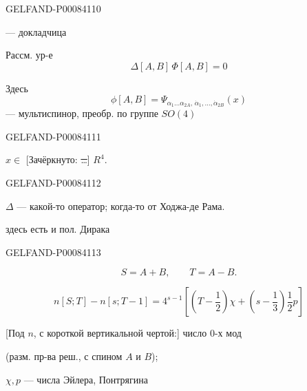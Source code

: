 \begin{GelfandAdjacentEvidence}{GELFAND-P000841}{10}


 — докладчица

Рассм. ур-е
\begin{equation*}
\Delta[A,B]\,\Phi[A,B]=0 \tag{1}
\end{equation*}

Здесь
\[
\phi[A,B]=\Psi_{\alpha_1\ldots\alpha_{2A},\,\dot\alpha_1,\ldots,\dot\alpha_{2B}}(x)
\]
— мультиспинор, преобр. по группе \(SO(4)\)
\end{GelfandAdjacentEvidence}
\begin{GelfandAdjacentEvidence}{GELFAND-P000841}{11}


\(x\in\) [Зачёркнуто: \sout{…}] \(R^4\).
\end{GelfandAdjacentEvidence}
\begin{GelfandAdjacentEvidence}{GELFAND-P000841}{12}


\(\Delta\) — какой-то оператор; когда-то от Ходжа-де Рама.

здесь есть и пол. Дирака
\end{GelfandAdjacentEvidence}
\begin{GelfandAdjacentEvidence}{GELFAND-P000841}{13}


\[
S=A+B,\qquad T=A-B.
\]

\begin{equation*}
n[S;T]-n[s;T-1]=4^{s-1}\left[\left(T-\frac12\right)\chi+\left(s-\frac13\right)\frac12p\right]
\tag{2}
\end{equation*}
\end{GelfandAdjacentEvidence}


[Под \(n\), с короткой вертикальной чертой:] число 0-х мод

(разм. пр-ва реш., с спином \(A\) и \(B\));

\(\chi,p\) — числа Эйлера, Понтрягина


